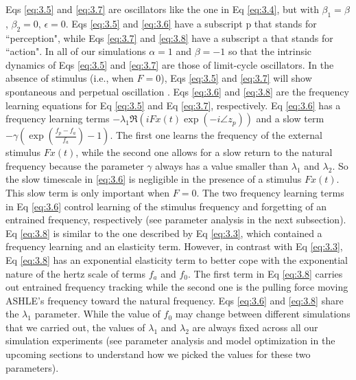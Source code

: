 \documentclass{report}
\begin{document}
Eqs \eqref{eq:3.5} and \eqref{eq:3.7} are oscillators like the one in Eq \eqref{eq:3.4}, but with $\beta_1 = \beta$, $\beta_2=0$, $\epsilon=0$. Eqs \eqref{eq:3.5} and \eqref{eq:3.6} have a subscript p that stands for ``perception", while Eqs \eqref{eq:3.7} and \eqref{eq:3.8} have a subscript a that stands for ``action". In all of our simulations $\alpha=1$ and $\beta=-1$ so that the intrinsic dynamics of Eqs \eqref{eq:3.5} and \eqref{eq:3.7} are those of limit-cycle oscillators. In the absence of stimulus (i.e., when $F = 0$), Eqs \eqref{eq:3.5} and \eqref{eq:3.7} will show spontaneous and perpetual oscillation \cite{kim2015signal}. Eqs \eqref{eq:3.6} and \eqref{eq:3.8} are the frequency learning equations for Eq \eqref{eq:3.5} and Eq \eqref{eq:3.7}, respectively. Eq \eqref{eq:3.6} has a frequency learning terms $-\lambda_1\Re\left( iFx(t)\exp(-i\angle z_p) \right)$ and a slow term $-\gamma\left( \exp\left(\frac{f_p-f_a}{f_a}\right)-1 \right)$. The first one learns the frequency of the external stimulus $Fx(t)$, while the second one allows for a slow return to the natural frequency because the parameter $\gamma$ always has a value smaller than $\lambda_1$ and $\lambda_2$. So the slow timescale in \eqref{eq:3.6} is negligible in the presence of a stimulus $Fx(t)$. This slow term is only important when $F = 0$. The two frequency learning terms in Eq \eqref{eq:3.6} control learning of the stimulus frequency and forgetting of an entrained frequency, respectively (see parameter analysis in the next subsection). Eq \eqref{eq:3.8} is similar to the one described by Eq \eqref{eq:3.3}, which contained a frequency learning and an elasticity term. However, in contrast with Eq \eqref{eq:3.3}, Eq \eqref{eq:3.8} has an exponential elasticity term to better cope with the exponential nature of the hertz scale of terms $f_a$ and $f_0$. The first term in Eq \eqref{eq:3.8} carries out entrained frequency tracking while the second one is the pulling force moving ASHLE's frequency toward the natural frequency. Eqs \eqref{eq:3.6} and \eqref{eq:3.8} share the $\lambda_1$ parameter. While the value of $f_0$ may change between different simulations that we carried out, the values of $\lambda_1$ and $\lambda_2$ are always fixed across all our simulation experiments (see parameter analysis and model optimization in the upcoming sections to understand how we picked the values for these two parameters).
\end{document}
